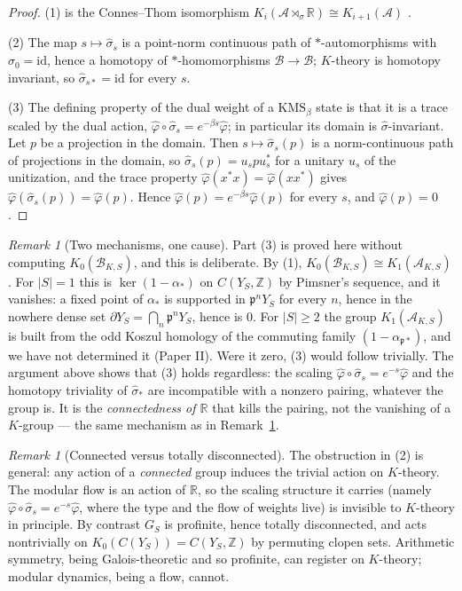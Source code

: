 \documentclass[11pt]{amsart}
\numberwithin{equation}{section}
\theoremstyle{definition}
\theoremstyle{remark}
\newtheorem{remark}[theorem]{Remark}
\newcommand{\Z}{\mathbb{Z}}
\newcommand{\R}{\mathbb{R}}
\newcommand{\cA}{\mathcal{A}}
\newcommand{\cB}{\mathcal{B}}
\newcommand{\pp}{\mathfrak{p}}
\newcommand{\id}{\mathrm{id}}
\begin{document}
\begin{proof}
(1) is the Connes--Thom isomorphism $K_i(\cA\rtimes_\sigma\R)\cong K_{i+1}(\cA)$ \cite{CT}.

(2) The map $s\mapsto\hat\sigma_s$ is a point-norm continuous path of $*$-automorphisms with
$\hat\sigma_0=\id$, hence a homotopy of $*$-homomorphisms $\cB\to\cB$; $K$-theory is homotopy
invariant, so $\hat\sigma_{s*}=\id$ for every $s$.

(3) The defining property of the dual weight of a $\mathrm{KMS}_\beta$ state is that it is a
trace scaled by the dual action, $\hat\varphi\circ\hat\sigma_s=e^{-\beta s}\hat\varphi$;
in particular its domain is $\hat\sigma$-invariant. Let $p$ be a projection in the domain.
Then $s\mapsto\hat\sigma_s(p)$ is a norm-continuous path of projections in the domain, so
$\hat\sigma_s(p)=u_spu_s^*$ for a unitary $u_s$ of the unitization, and the trace property
$\hat\varphi(x^*x)=\hat\varphi(xx^*)$ gives $\hat\varphi(\hat\sigma_s(p))=\hat\varphi(p)$. Hence
$\hat\varphi(p)=e^{-\beta s}\hat\varphi(p)$ for every $s$, and $\hat\varphi(p)=0$.
\end{proof}

\begin{remark}[Two mechanisms, one cause]\label{rem:twomech}
Part (3) is proved here without computing $K_0(\cB_{K,S})$, and this is deliberate. By (1),
$K_0(\cB_{K,S})\cong K_1(\cA_{K,S})$. For $|S|=1$ this is $\ker(1-\alpha_*)$ on $C(Y_S,\Z)$
by Pimsner's sequence, and it vanishes: a fixed point of $\alpha_*$ is supported in
$\pp^nY_S$ for every $n$, hence in the nowhere dense set $\partial Y_S=\bigcap_n\pp^nY_S$,
hence is $0$. For $|S|\ge2$ the group $K_1(\cA_{K,S})$ is built from the odd Koszul homology
of the commuting family $(1-\alpha_{\pp*})$, and we have not determined it (Paper II). Were
it zero, (3) would follow trivially. The argument above shows that (3) holds regardless: the
scaling $\hat\varphi\circ\hat\sigma_s=e^{-s}\hat\varphi$ and the homotopy triviality of
$\hat\sigma_*$ are incompatible with a nonzero pairing, whatever the group is. It is the
\emph{connectedness of $\R$} that kills the pairing, not the vanishing of a $K$-group ---
the same mechanism as in Remark~\ref{rem:connected}.
\end{remark}

\begin{remark}[Connected versus totally disconnected]\label{rem:connected}
The obstruction in (2) is general: any action of a \emph{connected} group induces the
trivial action on $K$-theory. The modular flow is an action of $\R$, so the scaling
structure it carries (namely $\hat\varphi\circ\hat\sigma_s=e^{-s}\hat\varphi$, where the type
and the flow of weights live) is invisible to $K$-theory in principle. By contrast $G_S$ is
profinite, hence totally disconnected, and acts nontrivially on $K_0(C(Y_S))=C(Y_S,\Z)$ by
permuting clopen sets. Arithmetic symmetry, being Galois-theoretic and so profinite, can
register on $K$-theory; modular dynamics, being a flow, cannot.
\end{remark}
\end{document}
